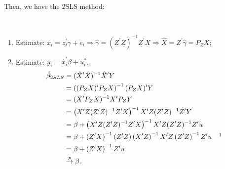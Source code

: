 Then, we have the 2SLS method:
\begin{definition}
    \ 
    \begin{enumerate}
        \item Estimate: $x_i = z_i^{\prime} \gamma + e_i \Rightarrow \hat{\gamma} = (Z^{\prime} Z)^{-1}Z^{\prime} X \Rightarrow \hat{X} = Z^{\prime} \hat{\gamma} = P_Z X$;
        \item Estimate: $y_i = \hat{x}_i^{\prime} \beta + u_i^*$.
        \begin{align*}
            \hat{\beta}_{2SLS} &= (\hat{X}^{\prime} \hat{X})^{-1}\hat{X}^{\prime} Y \\ 
            &= \left((P_Z X)^{\prime} P_Z X\right)^{-1} (P_Z X)^{\prime} Y \\ 
            &= (X^{\prime} P_Z X)^{-1} X^{\prime} P_Z Y \\
            &= \left(X^{\prime} Z (Z^{\prime} Z)^{-1} Z^{\prime} X\right)^{-1} X^{\prime} Z (Z^{\prime} Z)^{-1} Z^{\prime} Y \\ 
            &= \beta + \left(X^{\prime} Z (Z^{\prime} Z)^{-1} Z^{\prime} X\right)^{-1} X^{\prime} Z (Z^{\prime} Z)^{-1} Z^{\prime} u \\ 
            &= \beta + \left(Z^{\prime} X\right)^{-1} \left(Z^{\prime} Z\right) \left(X^{\prime} Z\right)^{-1} X^{\prime} Z \left(Z^{\prime} Z\right)^{-1}  Z^{\prime} u \quad \footnotemark \\
            &= \beta + \left(Z^{\prime} X\right)^{-1} Z^{\prime} u \\
            &\overset{p}{\rightarrow} \beta.
        \end{align*}
    \end{enumerate}
\end{definition}

